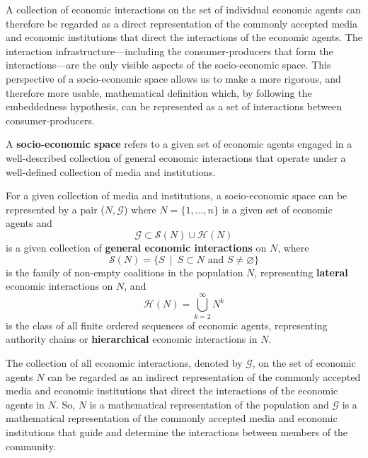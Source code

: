 A collection of economic interactions on the set of individual economic agents can therefore be regarded as a direct representation of the commonly accepted media and economic institutions that direct the interactions of the economic agents. The interaction infrastructure---including the consumer-producers that form the interactions---are the only visible aspects of the socio-economic space. This perspective of a socio-economic space allows us to make a more rigorous, and therefore more usable, mathematical definition which, by following the embeddedness hypothesis, can be represented as a set of interactions between consumer-producers.
\begin{definition} \label{def:socioeconomicspace}
A \textbf{socio-economic space} refers to a given set of economic agents engaged in a well-described collection of general economic interactions that operate under a well-defined collection of media and institutions. 

For a given collection of media and institutions, a socio-economic space can be represented by a pair ($N, \mathcal{G}$) where $N = \{ 1, \ldots, n \}$ is a given set of economic agents and
\begin{equation}
\mathcal{G} \subset \mathcal{S}(N) \cup \mathcal{H}(N)
\end{equation}
is a given collection of \textbf{general economic interactions} on $N$, where
\begin{equation}
\mathcal{S}(N) = \{ S ~ \mid ~ S \subset N \mbox{ and } S \neq \varnothing \}
\end{equation}
is the family of non-empty coalitions in the population $N$, representing \textbf{lateral} economic interactions on $N$, and
\begin{equation}
\mathcal{H}(N) = \bigcup_{k = 2}^{\infty} N^{k}
\end{equation}
is the class of all finite ordered sequences of economic agents, representing authority chains or \textbf{hierarchical} economic interactions in $N$.
\end{definition}
The collection of all economic interactions, denoted by $\mathcal{G}$, on the set of economic agents $N$ can be regarded as an indirect representation of the commonly accepted media and economic institutions that direct the interactions of the economic agents in $N$. So, $N$ is a mathematical representation of the population and $\mathcal{G}$ is a mathematical representation of the commonly accepted media and economic institutions that guide and determine the interactions between members of the community.

